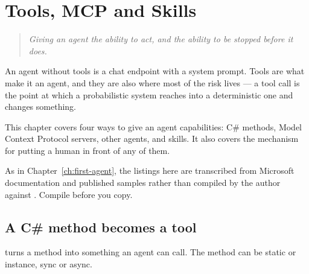 \chapter{Tools, MCP and Skills}
\label{ch:tools}

\begin{quote}
\itshape
Giving an agent the ability to act, and the ability to be stopped before it does.
\end{quote}

\noindent
An agent without tools is a chat endpoint with a system prompt. Tools are what
make it an agent, and they are also where most of the risk lives --- a tool call
is the point at which a probabilistic system reaches into a deterministic one and
changes something.

This chapter covers four ways to give an agent capabilities: C\# methods, Model
Context Protocol servers, other agents, and skills. It also covers the mechanism
for putting a human in front of any of them.

\begin{verifybox}
As in Chapter~\ref{ch:first-agent}, the listings here are transcribed from
Microsoft documentation and published samples rather than compiled by the author
against \mafcore{}. Compile before you copy.
\end{verifybox}

\section{A C\# method becomes a tool}
\label{sec:function-tools}

 turns a method into something an agent can call.
The method can be static or instance, sync or async.


